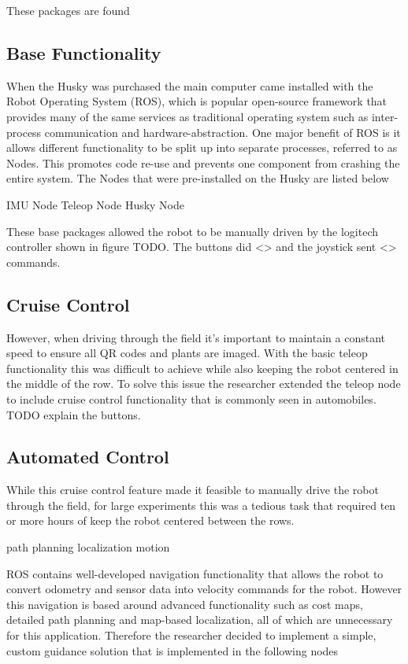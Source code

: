 These packages are found 

\subsection{Base Functionality}

When the Husky was purchased the main computer came installed with the Robot Operating System (ROS), which is popular open-source framework that provides many of the same services as traditional operating system such as inter-process communication and hardware-abstraction.  One major benefit of ROS is it allows different functionality to be split up into separate processes, referred to as Nodes.  This promotes code re-use and prevents one component from crashing the entire system.   The Nodes that were pre-installed on the Husky are listed below

IMU Node
Teleop Node
Husky Node

These base packages allowed the robot to be manually driven by the logitech controller shown in figure TODO.  The buttons did <> and the joystick sent <> commands.  

\subsection{Cruise Control}

However, when driving through the field it's important to maintain a constant speed to ensure all QR codes and plants are imaged.  With the basic teleop functionality this was difficult to achieve while also keeping the robot centered in the middle of the row. To solve this issue the researcher extended the teleop node to include cruise control functionality that is commonly seen in automobiles.  TODO explain the buttons.  

\subsection{Automated Control}

While this cruise control feature made it feasible to manually drive the robot through the field, for large experiments this was a tedious task that required ten or more hours of keep the robot centered between the rows.  

path planning
localization
motion

ROS contains well-developed navigation functionality that allows the robot to convert odometry and sensor data into velocity commands for the robot.  However this navigation is based around advanced functionality such as cost maps, detailed path planning and map-based localization, all of which are unnecessary for this application.  Therefore the researcher decided to implement a simple, custom guidance solution that is implemented in the following nodes

